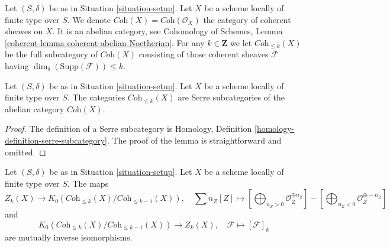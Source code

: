 \medskip\noindent
Let $(S, \delta)$ be as in Situation \ref{situation-setup}.
Let $X$ be a scheme locally of finite type over $S$.
We denote $\textit{Coh}(X) = \textit{Coh}(\mathcal{O}_X)$
the category of coherent sheaves on $X$.
It is an abelian category, see
Cohomology of Schemes, Lemma \ref{coherent-lemma-coherent-abelian-Noetherian}.
For any $k \in \mathbf{Z}$ we let $\textit{Coh}_{\leq k}(X)$
be the full subcategory of $\textit{Coh}(X)$
consisting of those coherent sheaves $\mathcal{F}$
having $\dim_\delta(\text{Supp}(\mathcal{F})) \leq k$.

\begin{lemma}
\label{lemma-Serre-subcategories}
Let $(S, \delta)$ be as in Situation \ref{situation-setup}.
Let $X$ be a scheme locally of finite type over $S$.
The categories $\textit{Coh}_{\leq k}(X)$ are Serre subcategories
of the abelian category $\textit{Coh}(X)$.
\end{lemma}

\begin{proof}
The definition of a Serre subcategory is
Homology, Definition \ref{homology-definition-serre-subcategory}.
The proof of the lemma is straightforward and omitted.
\end{proof}

\begin{lemma}
\label{lemma-cycles-k-group}
Let $(S, \delta)$ be as in Situation \ref{situation-setup}.
Let $X$ be a scheme locally of finite type over $S$.
The maps
$$
Z_k(X)
\longrightarrow
K_0(\textit{Coh}_{\leq k}(X)/\textit{Coh}_{\leq k - 1}(X)),
\quad
\sum n_Z[Z] \mapsto
\left[\bigoplus\nolimits_{n_Z > 0} \mathcal{O}_Z^{\oplus n_Z}\right]
-
\left[\bigoplus\nolimits_{n_Z < 0} \mathcal{O}_Z^{\oplus -n_Z}\right]
$$
and
$$
K_0(\textit{Coh}_{\leq k}(X)/\textit{Coh}_{\leq k - 1}(X))
\longrightarrow
Z_k(X),\quad
\mathcal{F} \longmapsto [\mathcal{F}]_k
$$
are mutually inverse isomorphisms.
\end{lemma}

